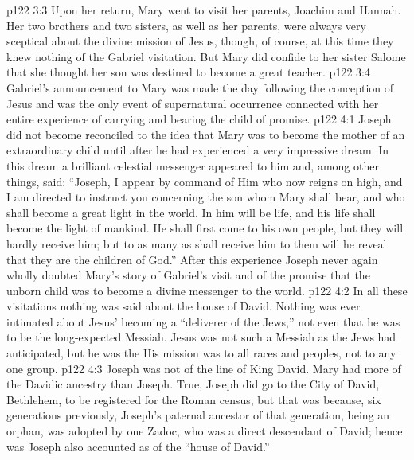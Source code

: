 \vs p122 3:3 Upon her return, Mary went to visit her parents, Joachim and Hannah. Her two brothers and two sisters, as well as her parents, were always very sceptical about the divine mission of Jesus, though, of course, at this time they knew nothing of the Gabriel visitation. But Mary did confide to her sister Salome that she thought her son was destined to become a great teacher.
\vs p122 3:4 \pc Gabriel’s announcement to Mary was made the day following the conception of Jesus and was the only event of supernatural occurrence connected with her entire experience of carrying and bearing the child of promise.
\vs p122 4:1 Joseph did not become reconciled to the idea that Mary was to become the mother of an extraordinary child until after he had experienced a very impressive dream. In this dream a brilliant celestial messenger appeared to him and, among other things, said: “Joseph, I appear by command of Him who now reigns on high, and I am directed to instruct you concerning the son whom Mary shall bear, and who shall become a great light in the world. In him will be life, and his life shall become the light of mankind. He shall first come to his own people, but they will hardly receive him; but to as many as shall receive him to them will he reveal that they are the children of God.” After this experience Joseph never again wholly doubted Mary’s story of Gabriel’s visit and of the promise that the unborn child was to become a divine messenger to the world.
\vs p122 4:2 \pc In all these visitations nothing was said about the house of David. Nothing was ever intimated about Jesus’ becoming a “deliverer of the Jews,” not even that he was to be the long\hyp{}expected Messiah. Jesus was not such a Messiah as the Jews had anticipated, but he was the  His mission was to all races and peoples, not to any one group.
\vs p122 4:3 Joseph was not of the line of King David. Mary had more of the Davidic ancestry than Joseph. True, Joseph did go to the City of David, Bethlehem, to be registered for the Roman census, but that was because, six generations previously, Joseph’s paternal ancestor of that generation, being an orphan, was adopted by one Zadoc, who was a direct descendant of David; hence was Joseph also accounted as of the “house of David.”
